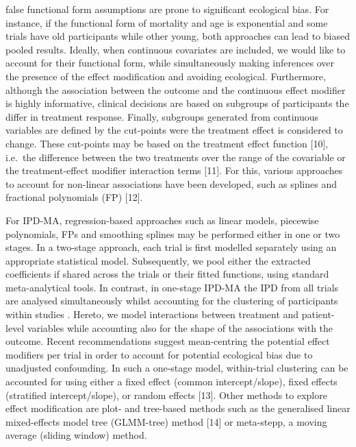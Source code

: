 \documentclass[14pt,]{article}
\begin{document}
false functional form assumptions are prone to significant ecological
bias. For instance, if the functional form of mortality and age is
exponential and some trials have old participants while other young,
both approaches can lead to biased pooled results. Ideally, when
continuous covariates are included, we would like to account for their
functional form, while simultaneously making inferences over the
presence of the effect modification and avoiding ecological.
Furthermore, although the association between the outcome and the
continuous effect modifier is highly informative, clinical decisions are
based on subgroups of participants the differ in treatment response.
Finally, subgroups generated from continuous variables are defined by
the cut-points were the treatment effect is considered to change. These
cut-points may be based on the treatment effect function {[}10{]},
i.e.~the difference between the two treatments over the range of the
covariable or the treatment-effect modifier interaction terms {[}11{]}.
For this, various approaches to account for non-linear associations have
been developed, such as splines and fractional polynomials (FP)
{[}12{]}.

\par

For IPD-MA, regression-based approaches such as linear models, piecewise
polynomials, FPs and smoothing splines may be performed either in one or
two stages. In a two-stage approach, each trial is first modelled
separately using an appropriate statistical model. Subsequently, we pool
either the extracted coefficients if shared across the trials or their
fitted functions, using standard meta-analytical tools. In contrast, in
one-stage IPD-MA the IPD from all trials are analysed simultaneously
whilst accounting for the clustering of participants within studies .
Hereto, we model interactions between treatment and patient-level
variables while accounting also for the shape of the associations with
the outcome. Recent recommendations suggest mean-centring the potential
effect modifiers per trial in order to account for potential ecological
bias due to unadjusted confounding. In such a one-stage model,
within-trial clustering can be accounted for using either a fixed effect
(common intercept/slope), fixed effects (stratified intercept/slope), or
random effects {[}13{]}. Other methods to explore effect modification
are plot- and tree-based methods such as the generalised linear
mixed-effects model tree (GLMM-tree) method {[}14{]} or meta-stepp, a
moving average (sliding window) method.
\end{document}
